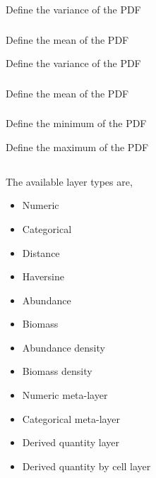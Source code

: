  {Define the variance of the PDF}

\subsubsection[Lognormal]{}

 {Define the mean of the PDF}

 {Define the variance of the PDF}

\subsubsection[Exponential]{}

 {Define the mean of the PDF}

\subsubsection[Uniform]{}

 {Define the minimum of the PDF}

 {Define the maximum of the PDF}

\subsection{}

The available layer types  are,

\begin{itemize}
	\item Numeric
	\item Categorical
	\item Distance
	\item Haversine
	\item Abundance
	\item Biomass
	\item Abundance density
	\item Biomass density
	\item Numeric meta-layer
	\item Categorical meta-layer
	\item Derived quantity layer
	\item Derived quantity by cell layer
\end{itemize}

